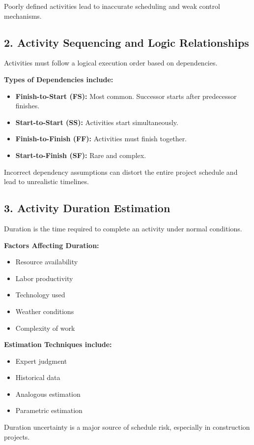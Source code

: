 \documentclass[12pt,a4paper]{article}
\begin{document}
Poorly defined activities lead to inaccurate scheduling and weak control mechanisms.

\subsection*{2. Activity Sequencing and Logic Relationships}
Activities must follow a logical execution order based on dependencies.

\textbf{Types of Dependencies include:}
\begin{itemize}
    \item \textbf{Finish-to-Start (FS):} Most common. Successor starts after predecessor finishes.
    \item \textbf{Start-to-Start (SS):} Activities start simultaneously.
    \item \textbf{Finish-to-Finish (FF):} Activities must finish together.
    \item \textbf{Start-to-Finish (SF):} Rare and complex.
\end{itemize}

Incorrect dependency assumptions can distort the entire project schedule and lead to unrealistic timelines.

\subsection*{3. Activity Duration Estimation}
Duration is the time required to complete an activity under normal conditions.

\textbf{Factors Affecting Duration:}
\begin{itemize}
    \item Resource availability
    \item Labor productivity
    \item Technology used
    \item Weather conditions
    \item Complexity of work
\end{itemize}

\textbf{Estimation Techniques include:}
\begin{itemize}
    \item Expert judgment
    \item Historical data
    \item Analogous estimation
    \item Parametric estimation
\end{itemize}

Duration uncertainty is a major source of schedule risk, especially in construction projects.
\end{document}
